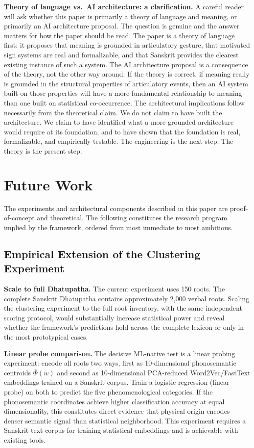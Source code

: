 \documentclass[12pt]{article}
\begin{document}
\textbf{Theory of language vs.~AI architecture: a clarification.} A careful reader will ask whether this paper is primarily a theory of language and meaning, or primarily an AI architecture proposal. The question is genuine and the answer matters for how the paper should be read. The paper is a theory of language first: it proposes that meaning is grounded in articulatory gesture, that motivated sign systems are real and formalizable, and that Sanskrit provides the clearest existing instance of such a system. The AI architecture proposal is a consequence of the theory, not the other way around. If the theory is correct, if meaning really is grounded in the structural properties of articulatory events, then an AI system built on those properties will have a more fundamental relationship to meaning than one built on statistical co-occurrence. The architectural implications follow necessarily from the theoretical claim. We do not claim to have built the architecture. We claim to have identified what a more grounded architecture would require at its foundation, and to have shown that the foundation is real, formalizable, and empirically testable. The engineering is the next step. The theory is the present step.


\section{Future Work}

The experiments and architectural components described in this paper are proof-of-concept and theoretical. The following constitutes the research program implied by the framework, ordered from most immediate to most ambitious.

\subsection{Empirical Extension of the Clustering Experiment}

\textbf{Scale to full Dhatupatha.} The current experiment uses 150 roots. The complete Sanskrit Dhatupatha contains approximately 2,000 verbal roots. Scaling the clustering experiment to the full root inventory, with the same independent scoring protocol, would substantially increase statistical power and reveal whether the framework's predictions hold across the complete lexicon or only in the most prototypical cases.

\textbf{Linear probe comparison.} The decisive ML-native test is a linear probing experiment: encode all roots two ways, first as 10-dimensional phonosemantic centroids $\bar{\Phi}(w)$ and second as 10-dimensional PCA-reduced Word2Vec/FastText embeddings trained on a Sanskrit corpus. Train a logistic regression (linear probe) on both to predict the five phenomenological categories. If the phonosemantic coordinates achieve higher classification accuracy at equal dimensionality, this constitutes direct evidence that physical origin encodes denser semantic signal than statistical neighborhood. This experiment requires a Sanskrit text corpus for training statistical embeddings and is achievable with existing tools.
\end{document}
